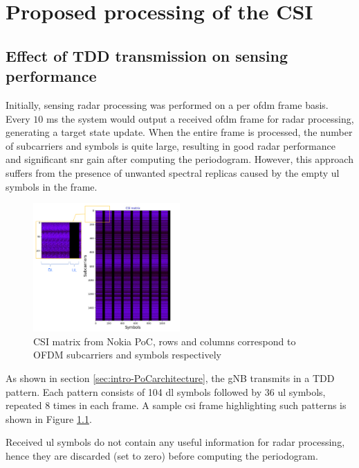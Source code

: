 \chapter{Proposed processing of the CSI}
\label{chap:TDD pattern of the OFDM frame}

\section{Effect of TDD transmission on sensing performance}

	Initially, sensing radar processing was performed on a per \gls{ofdm} frame basis. \protect\newline Every $10$ ms the system would output a received \gls{ofdm} frame for radar processing, generating a target state update. When the entire frame is processed, the number of subcarriers and symbols is quite large, resulting in good radar performance and significant \gls{snr} gain after computing the periodogram. However, this approach suffers from the presence of unwanted spectral replicas caused by the empty \gls{ul} symbols in the frame.
	
	\begin{figure}[H]
	    \centering
	    \includegraphics[width=0.5\textwidth]{Images/TDDprocessing/CSIMatrix_DLULpattern.png}
	    \caption{CSI matrix from Nokia PoC, rows and columns correspond to OFDM subcarriers and symbols respectively}
	    \label{fig:CSIMatrix_DLULpattern}
	\end{figure}
	
	As shown in section \ref{sec:intro-PoCarchitecture}, the gNB transmits in a TDD pattern. Each pattern consists of 104 \gls{dl} symbols followed by 36 \gls{ul} symbols, repeated 8 times in each frame. A sample \gls{csi} frame highlighting such patterns is shown in Figure \ref{fig:CSIMatrix_DLULpattern}.
	
	Received \gls{ul} symbols do not contain any useful information for radar processing, hence they are discarded (set to zero) before computing the periodogram.
	    
